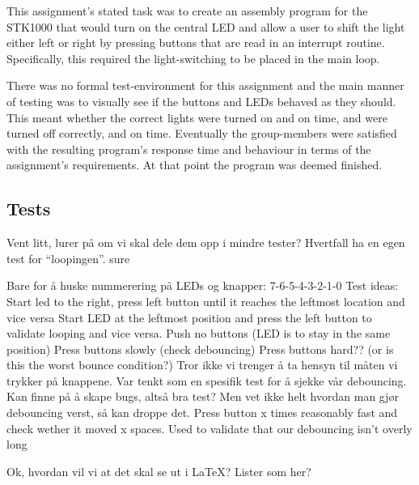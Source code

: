 This assignment’s stated task was to create an assembly program for the STK1000 that would turn on the central LED and allow a user to shift the light either left or right by pressing buttons that are read in an interrupt routine. Specifically, this required the light-switching to be placed in the main loop.

There was no formal test-environment for this assignment and the main manner of testing was to visually see if the buttons and LEDs behaved as they should. This meant whether the correct lights were turned on and on time, and were turned off correctly, and on time. 
Eventually the group-members were satisfied with the resulting program’s response time and behaviour in terms of the assignment’s requirements. At that point the program was deemed finished.

\subsection{Tests}
Vent litt, lurer på om vi skal dele dem opp i mindre tester? Hvertfall ha en egen test for “loopingen”. sure

Bare for å huske nummerering på LEDs og knapper:
7-6-5-4-3-2-1-0
Test ideas:
Start led to the right, press left button until it reaches the leftmost location and vice versa
Start LED at the leftmost position and press the left button to validate looping and vice versa.
Push no buttons (LED is to stay in the same position)
Press buttons slowly (check debouncing)
Press buttons hard?? (or is this the worst bounce condition?)
Tror ikke vi trenger å ta hensyn til måten vi trykker på knappene. Var tenkt som en spesifik test for å sjekke vår debouncing. Kan finne på å skape bugs, altså bra test? Men vet ikke helt hvordan man gjør debouncing verst, så kan droppe det.
Press button x times reasonably fast and check wether it moved x spaces. Used to validate that our debouncing isn’t overly long

Ok, hvordan vil vi at det skal se ut i LaTeX? Lister som her?






